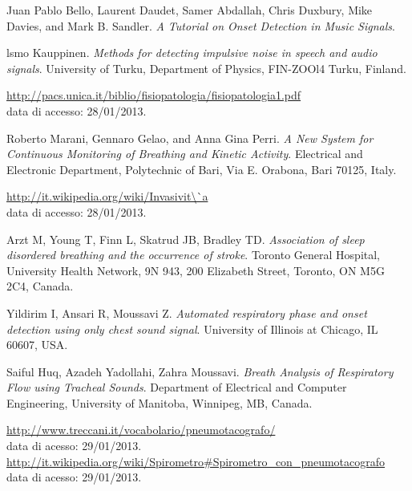 \begin{thebibliography}{99}
  Juan Pablo Bello, Laurent Daudet, Samer Abdallah, Chris Duxbury, Mike Davies, and Mark B. Sandler.
  \emph{A Tutorial on Onset Detection in Music Signals}.

  lsmo Kauppinen.
  \emph{Methods for detecting impulsive noise in speech and audio signals}.
  University of Turku, Department of Physics, FIN-ZOOl4 Turku, Finland.


   \url{ http://pacs.unica.it/biblio/fisiopatologia/fisiopatologia1.pdf}\\
   data di accesso: 28/01/2013.


  Roberto Marani, Gennaro Gelao, and Anna Gina Perri.
  \emph{A New System for Continuous Monitoring of Breathing and Kinetic Activity}.
  Electrical and Electronic Department, Polytechnic of Bari, Via E. Orabona, Bari 70125, Italy.

  \url{http://it.wikipedia.org/wiki/Invasivit\`a}\\
  data di accesso: 28/01/2013.


  Arzt M, Young T, Finn L, Skatrud JB, Bradley TD.
  \emph{Association of sleep disordered breathing and the occurrence of stroke}.
  Toronto General Hospital, University Health Network, 9N 943, 200 Elizabeth Street, Toronto, ON M5G 2C4, Canada.

  Yildirim I, Ansari R, Moussavi Z.
  \emph{Automated respiratory phase and onset detection using only chest sound signal}.
  University of Illinois at Chicago, IL 60607, USA.


  Saiful Huq, Azadeh Yadollahi, Zahra Moussavi.
  \emph{Breath Analysis of Respiratory Flow using Tracheal Sounds}.
  Department of Electrical and Computer Engineering, University of Manitoba, Winnipeg, MB, Canada.



  \url{http://www.treccani.it/vocabolario/pneumotacografo/}\\
  data di acesso: 29/01/2013.
  \url{http://it.wikipedia.org/wiki/Spirometro#Spirometro_con_pneumotacografo}\\
  data di acesso: 29/01/2013.


\end{thebibliography}
